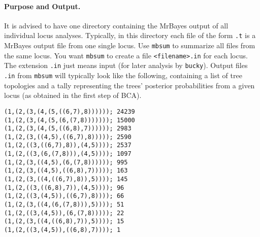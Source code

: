\documentclass[12pt,english,final,letterpaper]{article}
\begin{document}
\paragraph{Purpose and Output.}
It is advised to have one directory containing the MrBayes output 
of all individual locus analyses. Typically, in this directory
each file of the form {\tt *.t} is a MrBayes output file from one 
single locus.  Use {\tt mbsum} to summarize all files from the
same locus. You want {\tt mbsum} to create a file 
\verb+<filename>.in+ for each locus. 
The extension \verb+.in+
just means input (for later analysis by {\tt bucky}). 
Output files {\tt *.in} from {\tt mbsum} will typically look like the following,
containing a list of tree topologies and a tally representing the trees' posterior
probabilities from a given locus (as obtained in the first step of BCA).
\begin{verbatim}
(1,(2,(3,(4,(5,((6,7),8)))))); 24239
(1,(2,(3,(4,(5,(6,(7,8))))))); 15000
(1,(2,(3,(4,(5,((6,8),7)))))); 2983
(1,(2,(3,((4,5),((6,7),8))))); 2590
(1,(2,((3,((6,7),8)),(4,5)))); 2537
(1,(2,((3,(6,(7,8))),(4,5)))); 1097
(1,(2,(3,((4,5),(6,(7,8)))))); 995
(1,(2,(3,((4,5),((6,8),7))))); 163
(1,(2,(3,((4,((6,7),8)),5)))); 145
(1,(2,((3,((6,8),7)),(4,5)))); 96
(1,(2,((3,(4,5)),((6,7),8)))); 66
(1,(2,(3,((4,(6,(7,8))),5)))); 51
(1,(2,((3,(4,5)),(6,(7,8))))); 22
(1,(2,(3,((4,((6,8),7)),5)))); 15
(1,(2,((3,(4,5)),((6,8),7)))); 1
\end{verbatim}
 
\end{document}
